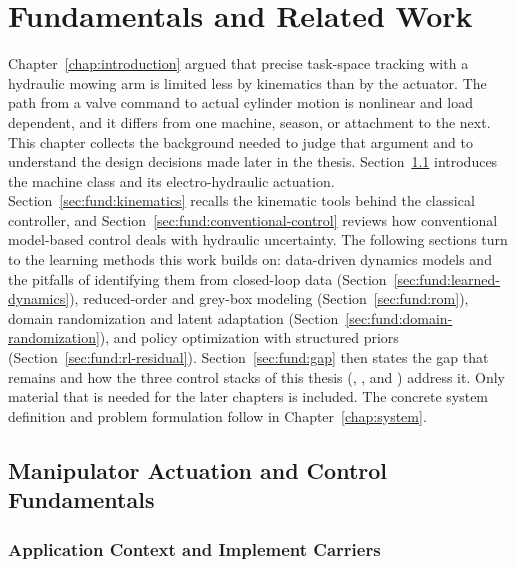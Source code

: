 \chapter{Fundamentals and Related Work}
\label{chap:fundamentals}

Chapter~\ref{chap:introduction} argued that precise task-space tracking
with a hydraulic mowing arm is limited less by kinematics than by the
actuator. The path from a valve command to actual cylinder motion is
nonlinear and load dependent, and it differs from one machine, season, or
attachment to the next. This chapter collects the background needed to
judge that argument and to understand the design decisions made later in
the thesis. Section~\ref{sec:fund:actuation} introduces the machine class
and its electro-hydraulic actuation. Section~\ref{sec:fund:kinematics}
recalls the kinematic tools behind the classical controller, and
Section~\ref{sec:fund:conventional-control} reviews how conventional
model-based control deals with hydraulic uncertainty. The following
sections turn to the learning methods this work builds on: data-driven
dynamics models and the pitfalls of identifying them from closed-loop data
(Section~\ref{sec:fund:learned-dynamics}), reduced-order and grey-box
modeling (Section~\ref{sec:fund:rom}), domain randomization and latent
adaptation (Section~\ref{sec:fund:domain-randomization}), and policy
optimization with structured priors
(Section~\ref{sec:fund:rl-residual}).
Section~\ref{sec:fund:gap} then states the gap that remains and how the
three control stacks of this thesis (\ppoROM, \ppoIDFD, and
\ppoIDAAMFD) address it. Only material that is
needed for the later chapters is included. The concrete system definition
and problem formulation follow in Chapter~\ref{chap:system}.

\section{Manipulator Actuation and Control Fundamentals}
\label{sec:fund:actuation}

\subsection{Application Context and Implement Carriers}

